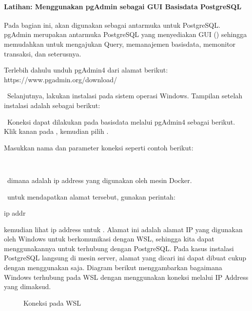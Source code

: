 \documentclass[letterpaper,10pt,english]{sphinxmanual}
\let\sphinxpxdimen\pdfpxdimen\else\newdimen\sphinxpxdimen
\begin{document}
\paragraph{Latihan: Menggunakan pgAdmin sebagai GUI Basisdata PostgreSQL}
\label{\detokenize{sesi2/relationaldb:latihan-menggunakan-pgadmin-sebagai-gui-basisdata-postgresql}}
Pada bagian ini,  akan digunakan sebagai antarmuka untuk PostgreSQL. pgAdmin merupakan antarmuka PostgreSQL yang menyediakan GUI () sehingga memudahkan untuk mengajukan Query, memanajemen basisdata, memonitor transaksi, dan seterusnya.

Terlebih dahulu unduh pgAdmin4 dari alamat berikut:
https://www.pgadmin.org/download/

 Selanjutnya, lakukan instalasi pada sistem operasi Windows. Tampilan  setelah instalasi adalah sebagai berikut:

 Koneksi dapat dilakukan pada basisdata melalui pgAdmin4 sebagai berikut. Klik kanan pada , kemudian pilih .


Masukkan nama dan parameter koneksi seperti contoh berikut:


 dimana  adalah ip address yang digunakan oleh mesin Docker.
 

 untuk mendapatkan alamat tersebut, gunakan perintah:

\begin{sphinxVerbatim}[commandchars=\\\{\}]
ip addr
\end{sphinxVerbatim}

kemudian lihat ip address untuk . Alamat ini adalah alamat IP yang digunakan oleh Windows untuk berkomunikasi dengan WSL, sehingga kita dapat menggunakannya untuk terhubung dengan PostgreSQL. Pada kasus instalasi PostgreSQL langsung di mesin server, alamat yang dicari ini dapat dibuat cukup dengan menggunakan  saja. Diagram berikut menggambarkan bagaimana Windows terhubung pada WSL dengan menggunakan koneksi melalui IP Address yang dimaksud.

\begin{figure}[htbp]
\centering
\capstart

\noindent\sphinxincludegraphics[height=300\sphinxpxdimen]{{2020-12-03-09-00-55}.png}
\caption{Koneksi pada WSL}\label{\detokenize{sesi2/relationaldb:table2}}\end{figure}
\end{document}
